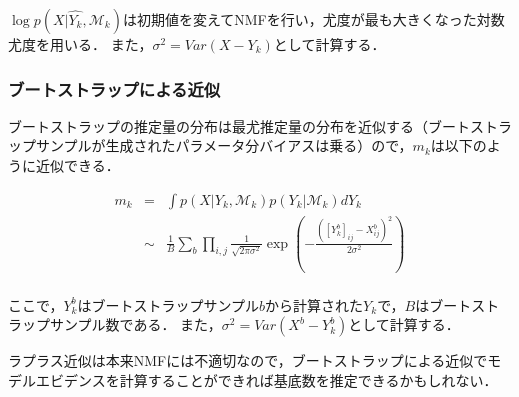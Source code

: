$\log p(X | \hat{Y_k}, \mathcal{M}_k)$は初期値を変えてNMFを行い，尤度が最も大きくなった対数尤度を用いる．
また，$\sigma^2 = Var(X - Y_k)$として計算する．

\subsubsection{ブートストラップによる近似}
ブートストラップの推定量の分布は最尤推定量の分布を近似する（ブートストラップサンプルが生成されたパラメータ分バイアスは乗る）ので，$m_k$は以下のように近似できる．

\begin{eqnarray}
	m_k &=& \int p(X | Y_k, \mathcal{M}_k) p(Y_k| \mathcal{M}_k) dY_k \\
	&\sim& \frac{1}{B} \sum_b \prod_{i,j} \frac{1}{\sqrt{2 \pi \sigma^2}} \exp\left(-\frac{([Y_k^b]_{ij} - X^b_{ij})^2}{2 \sigma^2} \right) \\
	\label{eq:simm2}
\end{eqnarray}

ここで，$Y_k^b$はブートストラップサンプル$b$から計算された$Y_k$で，$B$はブートストラップサンプル数である．
また，$\sigma^2 = Var(X^b - Y^b_k)$として計算する．

ラプラス近似は本来NMFには不適切なので，ブートストラップによる近似でモデルエビデンスを計算することができれば基底数を推定できるかもしれない．
